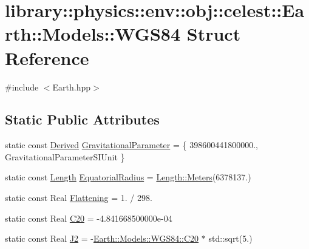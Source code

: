 \hypertarget{structlibrary_1_1physics_1_1env_1_1obj_1_1celest_1_1_earth_1_1_models_1_1_w_g_s84}{}\section{library\+:\+:physics\+:\+:env\+:\+:obj\+:\+:celest\+:\+:Earth\+:\+:Models\+:\+:W\+G\+S84 Struct Reference}
\label{structlibrary_1_1physics_1_1env_1_1obj_1_1celest_1_1_earth_1_1_models_1_1_w_g_s84}


{\ttfamily \#include $<$Earth.\+hpp$>$}

\subsection*{Static Public Attributes}
\begin{DoxyCompactItemize}
\item 
static const \hyperlink{classlibrary_1_1physics_1_1units_1_1_derived}{Derived} \hyperlink{structlibrary_1_1physics_1_1env_1_1obj_1_1celest_1_1_earth_1_1_models_1_1_w_g_s84_a1e081802c12761a82568b6c7113c912d}{Gravitational\+Parameter} = \{ 398600441800000., Gravitational\+Parameter\+S\+I\+Unit \}
\item 
static const \hyperlink{classlibrary_1_1physics_1_1units_1_1_length}{Length} \hyperlink{structlibrary_1_1physics_1_1env_1_1obj_1_1celest_1_1_earth_1_1_models_1_1_w_g_s84_aee90c4d0599ffe6c6c677bb41f2ec74d}{Equatorial\+Radius} = \hyperlink{classlibrary_1_1physics_1_1units_1_1_length_ad523a3737d5c3f23a64588eac83f2148}{Length\+::\+Meters}(6378137.)
\item 
static const Real \hyperlink{structlibrary_1_1physics_1_1env_1_1obj_1_1celest_1_1_earth_1_1_models_1_1_w_g_s84_a069e4726791f8468019031d52adf99d0}{Flattening} = 1. / 298.
\item 
static const Real \hyperlink{structlibrary_1_1physics_1_1env_1_1obj_1_1celest_1_1_earth_1_1_models_1_1_w_g_s84_a10f72d2266521d5f5303e9a1ace4c492}{C20} = -\/4.\+841668500000e-\/04
\item 
static const Real \hyperlink{structlibrary_1_1physics_1_1env_1_1obj_1_1celest_1_1_earth_1_1_models_1_1_w_g_s84_ad5eb43e9e57723f3fed7f3da55e6d821}{J2} = -\/\hyperlink{structlibrary_1_1physics_1_1env_1_1obj_1_1celest_1_1_earth_1_1_models_1_1_w_g_s84_a10f72d2266521d5f5303e9a1ace4c492}{Earth\+::\+Models\+::\+W\+G\+S84\+::\+C20} $\ast$ std\+::sqrt(5.)
\end{DoxyCompactItemize}


